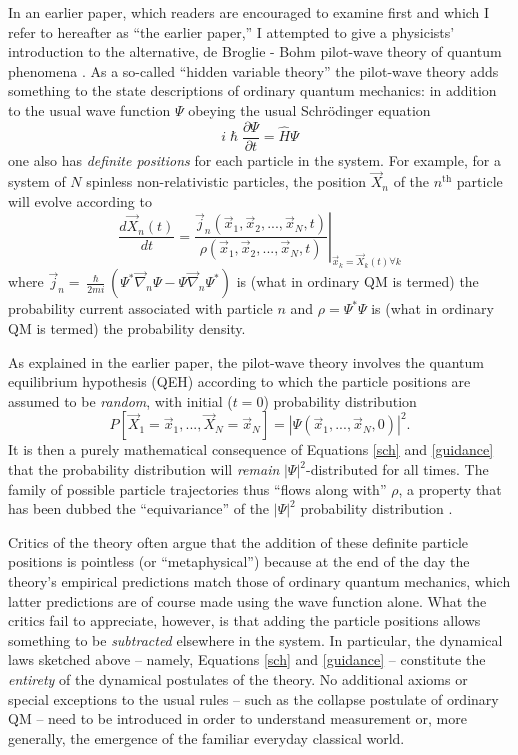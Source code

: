 \documentclass[aps,prc,onecolumn,letterpaper,floatfix,12pt]{revtex4}
\renewcommand{\hbar}{\hslash}
\begin{document}
In an earlier paper, which readers are encouraged to examine first and
which I refer to hereafter as ``the earlier paper,'' I
attempted to give a physicists' introduction to the alternative, de
Broglie - Bohm 
pilot-wave theory of quantum phenomena \cite{pwp}.   
As a so-called ``hidden
variable theory'' the pilot-wave theory adds something to the state
descriptions of ordinary quantum mechanics:  in addition to the usual
wave function $\Psi$ obeying the usual Schr\"odinger equation
\begin{equation}
i \hbar \frac{\partial \Psi}{\partial t} = \hat{H} \Psi
\label{sch}
\end{equation}
one also has
\emph{definite positions} for each particle in the system.  
For example, for a system of $N$ spinless non-relativistic
particles, the position $\vec{X}_n$ of the $n^{\text{th}}$ particle will
evolve according to
\begin{equation}
\frac{d \vec{X}_n(t)}{dt} = \left. \frac{\vec{j}_n(\vec{x}_1,
    \vec{x}_2, ... , \vec{x}_N, t)}{\rho(\vec{x}_1,\vec{x}_2, ...,
    \vec{x}_N, t)} \right|_{\vec{x}_k = \vec{X}_k(t) \forall k}
\label{guidance}
\end{equation}
where $\vec{j}_n = \frac{\hbar}{2mi} \left( \Psi^* \vec{\nabla}_n \Psi
  - \Psi \vec{\nabla}_n \Psi^* \right)$ is (what in ordinary QM is
termed) the probability current associated with particle $n$ and $\rho
= \Psi^* \Psi$ is (what in ordinary QM is termed) the probability
density. 

As explained in the earlier paper, the pilot-wave theory involves the
quantum equilibrium hypothesis (QEH) according to which 
the particle positions are assumed to be \emph{random}, with
initial ($t=0$) probability distribution
\begin{equation}
P[\vec{X}_1 = \vec{x}_1, ..., \vec{X}_N = \vec{x}_N] = \left|
  \Psi(\vec{x}_1, ..., \vec{x}_N, 0) \right|^2.
\end{equation}
It is then a purely mathematical consequence of Equations \eqref{sch}
and \eqref{guidance} that the probability distribution will
\emph{remain} $|\Psi|^2$-distributed for all times.  The family of
possible particle trajectories thus ``flows along with'' $\rho$, a
property that has been dubbed the ``equivariance'' of the $|\Psi|^2$
probability distribution \cite{qe}.   

Critics of the theory often argue that the addition of these definite
particle positions is pointless (or ``metaphysical'') because at the
end of the day the theory's empirical predictions match those of
ordinary quantum mechanics, which latter predictions are of course
made using the wave function alone.  What the critics fail to
appreciate, however, is that adding the particle positions allows
something to be \emph{subtracted} elsewhere in the system.  In
particular, the dynamical laws sketched above -- namely,
Equations \eqref{sch} and \eqref{guidance}  -- constitute 
the \emph{entirety} of the dynamical
postulates of the theory.  No additional
axioms or special exceptions to the usual rules -- such
as the collapse postulate of ordinary QM --  need to be introduced in
order to understand measurement or, more generally, the emergence of
the familiar everyday classical world. 
\end{document}
